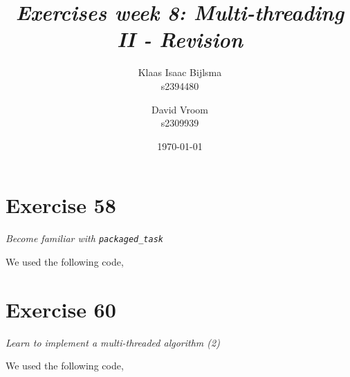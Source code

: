 \documentclass[12pt]{article}
\title{\itshape Exercises week 8: Multi-threading II - Revision}
\author{
	Klaas Isaac Bijlsma \\ s2394480
	\and
	David Vroom \\ s2309939
}
\date{\today}
\newcommand{\desc}[1]{\textit{#1} \vspace{1em}}
\begin{document}
\maketitle

\section*{Exercise 58}
\desc{Become familiar with \texttt{packaged\_task}}

We used the following code,



\clearpage

\section*{Exercise 60}
\desc{Learn to implement a multi-threaded algorithm (2)}

We used the following code,



\clearpage
\end{document}
